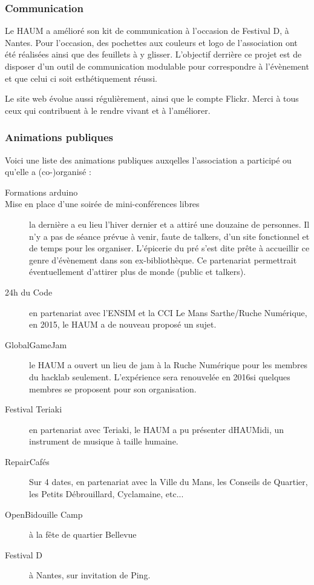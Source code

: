 \documentclass[a4paper, 11pt]{article}
\begin{document}
\subsubsection{Communication}

Le HAUM a amélioré son kit de communication à l'occasion de Festival D, à Nantes. Pour l'occasion, des pochettes aux
couleurs et logo de l'association ont été réalisées ainsi que des feuillets à y glisser. L'objectif derrière ce projet
est de disposer d'un outil de communication modulable pour correspondre à l'évènement et que celui ci soit esthétiquement réussi.

Le site web évolue aussi régulièrement, ainsi que le compte Flickr. Merci à tous ceux qui contribuent à le rendre vivant et à l'améliorer.

\subsubsection{Animations publiques \label{animationspubliques}}

Voici une liste des animations publiques auxqelles l'association a participé ou qu'elle a (co-)organisé :

\begin{description}
    \item[Formations arduino]
    \item[Mise en place d'une soirée de mini-conférences libres] la dernière a eu lieu l'hiver dernier et a attiré une
		douzaine de personnes. Il n'y a pas de séance prévue à venir, faute de talkers, d'un site fonctionnel et de
		temps pour les organiser. L'épicerie du pré s'est dite prête à accueillir ce genre d'évènement dans son ex-bibliothèque. Ce partenariat permettrait éventuellement d'attirer plus de monde (public et talkers).
    \item[24h du Code] en partenariat avec l'ENSIM et la CCI Le Mans Sarthe/Ruche Numérique, en 2015, le HAUM a de nouveau proposé un sujet.
	\item[GlobalGameJam] le HAUM a ouvert un lieu de jam à la Ruche Numérique pour les membres du hacklab seulement. L'expérience sera renouvelée en 2016si quelques membres se proposent pour son organisation.
    \item[Festival Teriaki] en partenariat avec Teriaki, le HAUM a pu présenter dHAUMidi, un instrument de musique à taille humaine.
	\item[RepairCafés] Sur 4 dates, en partenariat avec la Ville du Mans, les Conseils de Quartier, les Petits
		Débrouillard, Cyclamaine, etc...
	\item[OpenBidouille Camp] à la fête de quartier Bellevue
	\item[Festival D] à Nantes, sur invitation de Ping.
\end{description}
\end{document}
